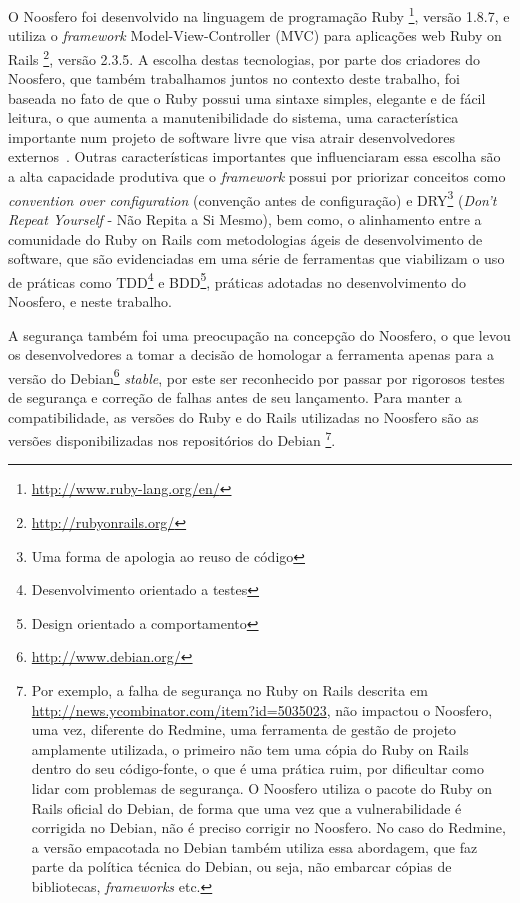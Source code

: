 
O Noosfero foi desenvolvido na linguagem de programação Ruby%
\footnote{\url{http://www.ruby-lang.org/en/}},
versão 1.8.7, e utiliza o \textit{framework} Model-View-Controller (MVC) para
aplicações web Ruby on Rails%
\footnote{\url{http://rubyonrails.org/}}, versão 2.3.5.
%
A escolha destas tecnologias, por parte dos criadores do Noosfero, que também
trabalhamos juntos no contexto deste trabalho,
foi baseada no fato de que o Ruby possui uma sintaxe
simples, elegante e de fácil leitura, o que aumenta a manutenibilidade do sistema,
uma característica importante num projeto de software livre que visa atrair
desenvolvedores externos~\cite{meirelles2013}. 
%
Outras características importantes que influenciaram essa escolha são a alta
capacidade produtiva que o \textit{framework} possui por priorizar conceitos como
\textit{convention over configuration} (convenção antes de configuração)
e DRY\footnote{Uma forma de apologia ao reuso de código}
(\textit{Don't Repeat Yourself} - Não Repita a Si Mesmo), bem como, o alinhamento
entre a comunidade do Ruby on Rails com metodologias ágeis de
desenvolvimento de software, que são evidenciadas em uma série de ferramentas que
viabilizam o uso de práticas como TDD\footnote{Desenvolvimento orientado a testes}
e BDD\footnote{Design orientado a comportamento}, práticas adotadas no
desenvolvimento do Noosfero, e neste trabalho.


A segurança também foi uma preocupação na concepção do Noosfero, o que levou os
desenvolvedores a tomar a decisão de homologar a ferramenta apenas para a
versão do Debian\footnote{\url{http://www.debian.org/}}
\textit{stable}, por este ser reconhecido por passar por rigorosos testes de
segurança e correção de falhas antes de seu lançamento. 
%
Para manter a compatibilidade, as versões do Ruby e do Rails utilizadas no
Noosfero são as versões disponibilizadas nos repositórios do Debian%
\footnote{Por exemplo, a falha de segurança no Ruby on Rails descrita em
\url{http://news.ycombinator.com/item?id=5035023}, não impactou o Noosfero, uma
vez, diferente do Redmine, uma ferramenta de gestão de projeto amplamente
utilizada, o primeiro não tem uma cópia do Ruby on Rails dentro do seu
código-fonte, o que é uma prática ruim, por dificultar como lidar com problemas
de segurança. O Noosfero utiliza o pacote do Ruby on Rails oficial do Debian,
de forma que uma vez que a vulnerabilidade é corrigida no Debian, não é preciso
corrigir no Noosfero. No caso do Redmine, a versão empacotada no Debian também
utiliza essa abordagem, que faz parte da política técnica do Debian, ou seja,
não embarcar cópias de bibliotecas, \textit{frameworks} etc.}.

